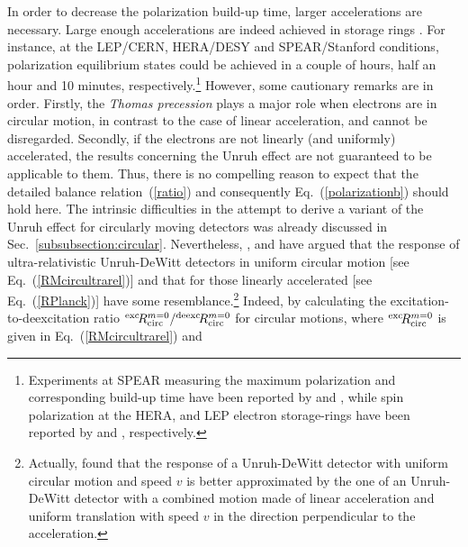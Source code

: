 \documentclass[12pt,nofootinbib,floatfix,aps,prd,showpacs,amsmath,amssymb,eqsecnum]{revtex4-2}
\begin{document}
In order to decrease the polarization build-up time, larger accelerations
are necessary. Large enough accelerations are
indeed achieved in storage rings \cite{Barber99}. 
For instance, 
at the LEP/CERN, HERA/DESY and SPEAR/Stanford conditions, polarization
equilibrium states could be achieved in a couple of hours, half an hour 
and 
10 minutes, 
respectively.\footnote{Experiments at SPEAR measuring the maximum 
polarization and corresponding build-up time have been reported 
by \textcite{Camerinietal75} and \textcite{Johnsonetal83}, 
while spin polarization at the HERA, and LEP electron storage-rings
have been reported by \textcite{Barberetal94} and 
\textcite{Knudsenetal91,Assmannetal95}, 
respectively.                  } 
However, some cautionary remarks are in order. 
Firstly, the {\em Thomas precession} plays a major role when electrons 
are in circular motion, in contrast to 
the case of linear acceleration, and cannot 
be disregarded. Secondly, if the electrons are not linearly (and
uniformly) accelerated, the results concerning the Unruh effect are not
guaranteed to be applicable to them.
Thus, there is no compelling reason to expect that the detailed balance 
relation~(\ref{ratio}) and consequently Eq.~(\ref{polarizationb}) should
hold here. The intrinsic difficulties in the attempt to 
derive a variant of the Unruh effect for circularly moving detectors 
was already 
discussed in Sec.~\ref{subsubsection:circular}. Nevertheless, 
\textcite{Letawetal80}, \textcite{Belletal83} 
and \textcite{Takagi86} have argued that the response 
of ultra-relativistic Unruh-DeWitt detectors 
in uniform circular motion [see Eq.~(\ref{RMcircultrarel})] 
and that for those 
linearly accelerated [see Eq.~(\ref{RPlanck})] have some 
resemblance.\footnote{Actually, 
                                \textcite{Takagi84} found that the response 
                                of a Unruh-DeWitt detector with 
                                uniform circular motion and speed 
                                $v$ is better approximated by the 
                                one of an Unruh-DeWitt detector 
                                with a combined motion made of
                                linear acceleration and uniform 
                                translation with speed $v$ in the
                                direction perpendicular to the acceleration.}
Indeed, by calculating the excitation-to-deexcitation ratio 
$^{\rm exc}\! R^{m=0}_{\rm circ}/ ^{\rm deexc}\! R^{m=0}_{\rm circ}$
for circular motions, where $^{\rm exc}\! R^{m=0}_{\rm circ}$
is given in Eq.~(\ref{RMcircultrarel}) and  
\end{document}
